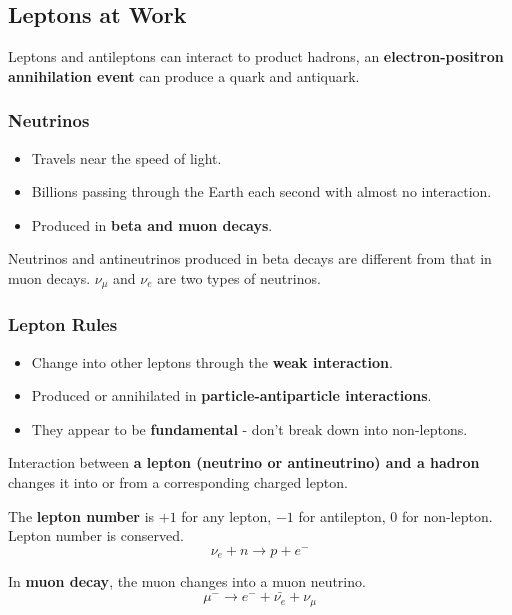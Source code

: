 \subsection{Leptons at Work}

Leptons and antileptons can interact to product hadrons, an \textbf{electron-positron annihilation event} can produce a quark and antiquark.

\subsubsection*{Neutrinos}

\begin{itemize}
    \item Travels near the speed of light.
    \item Billions passing through the Earth each second with almost no interaction.
    \item Produced in \textbf{beta and muon decays}.
\end{itemize}

Neutrinos and antineutrinos produced in beta decays are different from that in muon decays. $\nu_\mu$ and $\nu_e$ are two types of neutrinos.

\subsubsection*{Lepton Rules}

\begin{itemize}
    \item Change into other leptons through the \textbf{weak interaction}.
    \item Produced or annihilated in \textbf{particle-antiparticle interactions}.
    \item They appear to be \textbf{fundamental} - don't break down into non-leptons.
\end{itemize}

Interaction between \textbf{a lepton (neutrino or antineutrino) and a hadron} changes it into or from a corresponding charged lepton.

The \textbf{lepton number} is $+1$ for any lepton, $-1$ for antilepton, $0$ for non-lepton. Lepton number is conserved.
$$\nu_e+n\to p+e^-$$

In \textbf{muon decay}, the muon changes into a muon neutrino.
$$\mu^-\to e^-+\bar{\nu_e}+\nu_\mu$$
